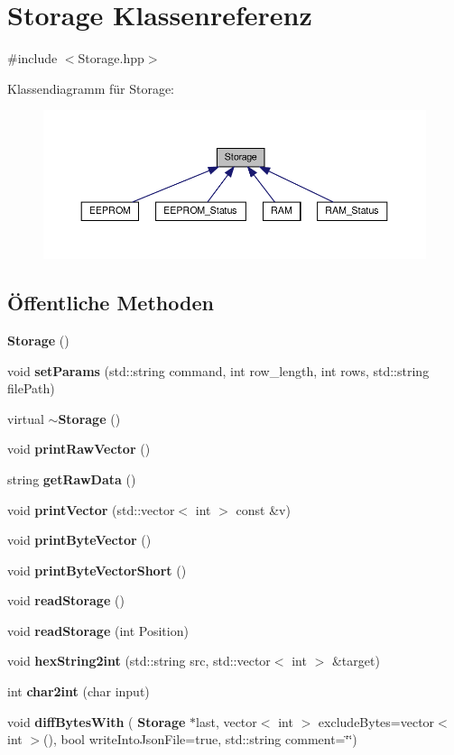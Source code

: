 \section{Storage Klassenreferenz}
\label{class_storage}


{\ttfamily \#include $<$Storage.\+hpp$>$}



Klassendiagramm für Storage\+:\nopagebreak
\begin{figure}[H]
\begin{center}
\leavevmode
\includegraphics[width=350pt]{class_storage__inherit__graph}
\end{center}
\end{figure}
\subsection*{Öffentliche Methoden}
\begin{DoxyCompactItemize}
\item 
\textbf{ Storage} ()
\item 
void \textbf{ set\+Params} (std\+::string command, int row\+\_\+length, int rows, std\+::string file\+Path)
\item 
virtual \textbf{ $\sim$\+Storage} ()
\item 
void \textbf{ print\+Raw\+Vector} ()
\item 
string \textbf{ get\+Raw\+Data} ()
\item 
void \textbf{ print\+Vector} (std\+::vector$<$ int $>$ const \&v)
\item 
void \textbf{ print\+Byte\+Vector} ()
\item 
void \textbf{ print\+Byte\+Vector\+Short} ()
\item 
void \textbf{ read\+Storage} ()
\item 
void \textbf{ read\+Storage} (int Position)
\item 
void \textbf{ hex\+String2int} (std\+::string src, std\+::vector$<$ int $>$ \&target)
\item 
int \textbf{ char2int} (char input)
\item 
void \textbf{ diff\+Bytes\+With} (\textbf{ Storage} $\ast$last, vector$<$ int $>$ exclude\+Bytes=vector$<$ int $>$(), bool write\+Into\+Json\+File=true, std\+::string comment=\char`\"{}\char`\"{})
\end{DoxyCompactItemize}
